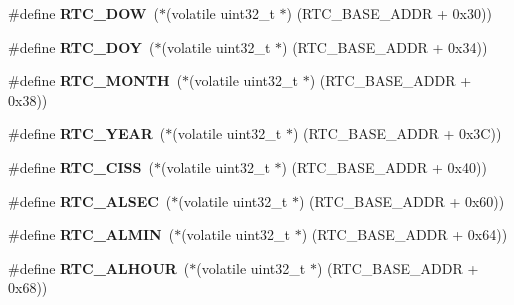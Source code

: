 \begin{DoxyCompactItemize}
\#define {\bfseries R\+T\+C\+\_\+\+D\+OW}~($\ast$(volatile uint32\+\_\+t $\ast$) (R\+T\+C\+\_\+\+B\+A\+S\+E\+\_\+\+A\+D\+DR + 0x30))
\item 
\mbox{\label{group__lpc24xx__regs_ga3bf57b4b5c9fe44d9dbd145a7bc57def}} 
\#define {\bfseries R\+T\+C\+\_\+\+D\+OY}~($\ast$(volatile uint32\+\_\+t $\ast$) (R\+T\+C\+\_\+\+B\+A\+S\+E\+\_\+\+A\+D\+DR + 0x34))
\item 
\mbox{\label{group__lpc24xx__regs_gabda0c877ee1a02b8351c0cfe72838088}} 
\#define {\bfseries R\+T\+C\+\_\+\+M\+O\+N\+TH}~($\ast$(volatile uint32\+\_\+t $\ast$) (R\+T\+C\+\_\+\+B\+A\+S\+E\+\_\+\+A\+D\+DR + 0x38))
\item 
\mbox{\label{group__lpc24xx__regs_ga1df5568e6774b73aa4c6e59fc40e9147}} 
\#define {\bfseries R\+T\+C\+\_\+\+Y\+E\+AR}~($\ast$(volatile uint32\+\_\+t $\ast$) (R\+T\+C\+\_\+\+B\+A\+S\+E\+\_\+\+A\+D\+DR + 0x3\+C))
\item 
\mbox{\label{group__lpc24xx__regs_ga7028a923d0410bcb9bca6040700524f1}} 
\#define {\bfseries R\+T\+C\+\_\+\+C\+I\+SS}~($\ast$(volatile uint32\+\_\+t $\ast$) (R\+T\+C\+\_\+\+B\+A\+S\+E\+\_\+\+A\+D\+DR + 0x40))
\item 
\mbox{\label{group__lpc24xx__regs_gae58b5bdb1c99567d1685d4676aa35427}} 
\#define {\bfseries R\+T\+C\+\_\+\+A\+L\+S\+EC}~($\ast$(volatile uint32\+\_\+t $\ast$) (R\+T\+C\+\_\+\+B\+A\+S\+E\+\_\+\+A\+D\+DR + 0x60))
\item 
\mbox{\label{group__lpc24xx__regs_ga8323b667e3224ab270526bbace0c1715}} 
\#define {\bfseries R\+T\+C\+\_\+\+A\+L\+M\+IN}~($\ast$(volatile uint32\+\_\+t $\ast$) (R\+T\+C\+\_\+\+B\+A\+S\+E\+\_\+\+A\+D\+DR + 0x64))
\item 
\mbox{\label{group__lpc24xx__regs_gad7f01dadf6e47ff12ff257657c58208d}} 
\#define {\bfseries R\+T\+C\+\_\+\+A\+L\+H\+O\+UR}~($\ast$(volatile uint32\+\_\+t $\ast$) (R\+T\+C\+\_\+\+B\+A\+S\+E\+\_\+\+A\+D\+DR + 0x68))
\item 
\mbox{\label{group__lpc24xx__regs_ga0ad48d0ace638fa30d44618095757820}} 

\end{DoxyCompactItemize}
